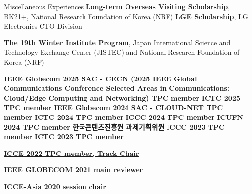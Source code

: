 \begin{rubric}{Miscellaneous Experiences}
\entry*[2015] \textbf{Long-term Overseas Visiting Scholarship}, \newline BK21+, National Research Foundation of Korea (NRF)
%
\entry*[2015] \textbf{LGE Scholarship}, \newline LG Electronics CTO Division

\entry*[2012] \textbf{The 19th Winter Institute Program}, \newline Japan International Science and Technology Exchange Center (JISTEC) and National Research Foundation of Korea (NRF)

\entry*[2025] \textbf{IEEE Globecom 2025 SAC - CECN (2025 IEEE Global Communications Conference Selected Areas in Communications: Cloud/Edge Computing and Networking) TPC member}
\entry*[2025] \textbf{ICTC 2025 TPC member}
\entry*[2024] \textbf{IEEE Globecom 2024 SAC - CLOUD-NET TPC member}
\entry*[2024] \textbf{ICTC 2024 TPC member}
\entry*[2024] \textbf{ICCC 2024 TPC member}
\entry*[2024] \textbf{ICUFN 2024 TPC member}
\entry*[2023] \textbf{한국콘텐츠진흥원 과제기획위원}
\entry*[2023] \textbf{ICCC 2023 TPC member} 
\entry*[2023] \textbf{ICTC 2023 TPC member} 

\entry*[2022] \faLink \href{https://edas.info/p28454}{\textbf{ICCE 2022 TPC member, Track Chair}}

\entry*[2021] \faLink \href{https://ieeexplore.ieee.org/abstract/document/9685923}{\textbf{IEEE GLOBECOM 2021 main reviewer}}

\entry*[2020] \faLink \href{http://icce-asia.cric.kr/2020/}{\textbf{ICCE-Asia 2020 session chair}}


\end{rubric}